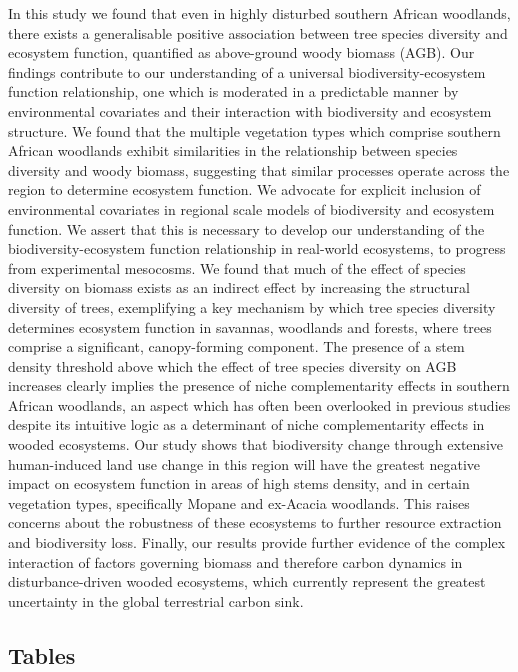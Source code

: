 \documentclass[12pt,a4paper]{article}
\begin{document}
In this study we found that even in highly disturbed southern African woodlands, there exists a generalisable positive association between tree species diversity and ecosystem function, quantified as above-ground woody biomass (AGB). Our findings contribute to our understanding of a universal biodiversity-ecosystem function relationship, one which is moderated in a predictable manner by environmental covariates and their interaction with biodiversity and ecosystem structure. We found that the multiple vegetation types which comprise southern African woodlands exhibit similarities in the relationship between species diversity and woody biomass, suggesting that similar processes operate across the region to determine ecosystem function. We advocate for explicit inclusion of environmental covariates in regional scale models of biodiversity and ecosystem function. We assert that this is necessary to develop our understanding of the biodiversity-ecosystem function relationship in real-world ecosystems, to progress from experimental mesocosms. We found that much of the effect of species diversity on biomass exists as an indirect effect by increasing the structural diversity of trees, exemplifying a key mechanism by which tree species diversity determines ecosystem function in savannas, woodlands and forests, where trees comprise a significant, canopy-forming component. The presence of a stem density threshold above which the effect of tree species diversity on AGB increases clearly implies the presence of niche complementarity effects in southern African woodlands, an aspect which has often been overlooked in previous studies despite its intuitive logic as a determinant of niche complementarity effects in wooded ecosystems. Our study shows that biodiversity change through extensive human-induced land use change in this region will have the greatest negative impact on ecosystem function in areas of high stems density, and in certain vegetation types, specifically Mopane and ex-Acacia woodlands. This raises concerns about the robustness of these ecosystems to further resource extraction and biodiversity loss. Finally, our results provide further evidence of the complex interaction of factors governing biomass and therefore carbon dynamics in disturbance-driven wooded ecosystems, which currently represent the greatest uncertainty in the global terrestrial carbon sink.

\newpage{}

\begin{landscape}
\section{Tables}

\end{landscape}
\end{document}
